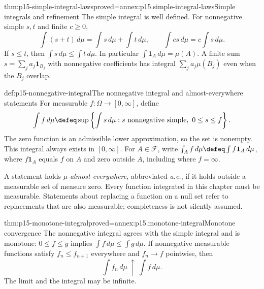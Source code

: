 \begin{hbtheorem}{thm:p15-simple-integral-laws}{proved=annex:p15.simple-integral-laws}{Simple integrals and refinement}
The simple integral is well defined. For nonnegative simple \(s,t\)
and finite \(c\geq0\),
\[
 \int(s+t)\,d\mu=\int s\,d\mu+\int t\,d\mu,\qquad
 \int cs\,d\mu=c\int s\,d\mu.
\]
If \(s\leq t\), then \(\int s\,d\mu\leq\int t\,d\mu\).
In particular \(\int\mathbf1_A\,d\mu=\mu(A)\). A finite sum
\(s=\sum_j a_j\mathbf1_{B_j}\) with nonnegative coefficients has
integral \(\sum_j a_j\mu(B_j)\) even when the \(B_j\) overlap.
\end{hbtheorem}

\begin{hbdefinition}{def:p15-nonnegative-integral}{The nonnegative integral and almost-everywhere statements}
For measurable \(f:\Omega\to[0,\infty]\), define
\[
 \int f\,d\mu\defeq
 \sup\left\{\int s\,d\mu:s\text{ nonnegative simple},\ 0\leq s\leq f\right\}.
\]
The zero function is an admissible lower approximation, so the set is
nonempty. This integral always exists in \([0,\infty]\).
For \(A\in\mathcal F\), write
\(\int_A f\,d\mu\defeq\int f\mathbf1_A\,d\mu\), where
\(f\mathbf1_A\) equals \(f\) on \(A\) and zero outside \(A\),
including where \(f=\infty\).

A statement holds \(\mu\)-\emph{almost everywhere}, abbreviated
\emph{a.e.}, if it holds outside a measurable set of measure zero.
Every function integrated in this chapter must be measurable. Statements
about replacing a function on a null set refer to replacements that are
also measurable; completeness is not silently assumed.
\end{hbdefinition}

\begin{hbtheorem}{thm:p15-monotone-integral}{proved=annex:p15.monotone-integral}{Monotone convergence}
The nonnegative integral agrees with the simple integral and is monotone:
\(0\leq f\leq g\) implies \(\int f\,d\mu\leq\int g\,d\mu\).
If nonnegative measurable functions satisfy \(f_n\leq f_{n+1}\)
everywhere and \(f_n\to f\) pointwise, then
\[
 \int f_n\,d\mu\ \uparrow\ \int f\,d\mu.
\]
The limit and the integral may be infinite.
\end{hbtheorem}


